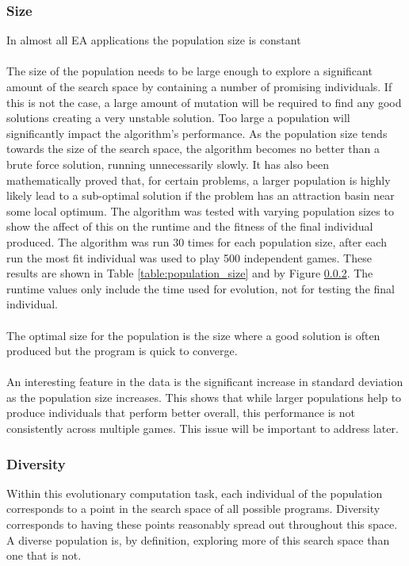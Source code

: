 \documentclass{article}
\begin{document}
\subsubsection{Size}
In almost all EA applications the population size is constant\cite[p. 20]{textbook}
\\\\
The size of the population needs to be large enough to explore a significant amount of the search space by containing a number of promising individuals. If this is not the case, a large amount of mutation will be required to find any good solutions creating a very unstable solution. Too large a population will significantly impact the algorithm's performance. As the population size tends towards the size of the search space, the algorithm becomes no better than a brute force solution, running unnecessarily slowly. It has also been mathematically proved that, for certain problems, a larger population is highly likely lead to a sub-optimal solution if the problem has an attraction basin near some local optimum\cite{unhelpful_large_populations}. The algorithm was tested with varying population sizes to show the affect of this on the runtime and the fitness of the final individual produced. The algorithm was run 30 times for each population size, after each run the most fit individual was used to play 500 independent games. These results are shown in Table \ref{table:population_size} and by Figure \ref{}. The runtime values only include the time used for evolution, not for testing the final individual.
\\\\
The optimal size for the population is the size where a good solution is often produced but the program is quick to converge.
\\\\
An interesting feature in the data is the significant increase in standard deviation as the population size increases. This shows that while larger populations help to produce individuals that perform better overall, this performance is not consistently across multiple games. This issue will be important to address later.

\subsubsection{Diversity}
Within this evolutionary computation task, each individual of the population corresponds to a point in the search space of all possible programs. %
Diversity corresponds to having these points reasonably spread out throughout this space. A diverse population is, by definition, exploring more of this search space than one that is not. %
\end{document}
